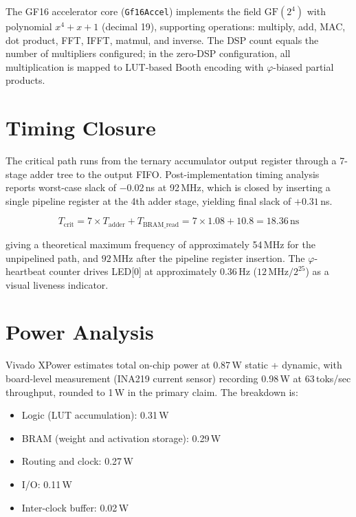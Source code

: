The GF16 accelerator core (\texttt{Gf16Accel}) implements the field $\mathrm{GF}(2^4)$ with polynomial $x^4 + x + 1$ (decimal 19), supporting operations: multiply, add, MAC, dot product, FFT, IFFT, matmul, and inverse. The DSP count equals the number of multipliers configured; in the zero-DSP configuration, all multiplication is mapped to LUT-based Booth encoding with $\varphi$-biased partial products.

\section{Timing Closure}

The critical path runs from the ternary accumulator output register through a 7-stage adder tree to the output FIFO. Post-implementation timing analysis reports worst-case slack of $-0.02$\,ns at 92\,MHz, which is closed by inserting a single pipeline register at the 4th adder stage, yielding final slack of $+0.31$\,ns.

\begin{equation}
T_{\mathrm{crit}} = 7 \times T_{\mathrm{adder}} + T_{\mathrm{BRAM\_read}} = 7 \times 1.08 + 10.8 = 18.36\,\text{ns}
\end{equation}

giving a theoretical maximum frequency of approximately 54\,MHz for the unpipelined path, and $92$\,MHz after the pipeline register insertion. The $\varphi$-heartbeat counter drives LED[0] at approximately 0.36\,Hz ($12\,\text{MHz} / 2^{25}$) as a visual liveness indicator.

\section{Power Analysis}

Vivado XPower estimates total on-chip power at 0.87\,W static + dynamic, with board-level measurement (INA219 current sensor) recording 0.98\,W at 63\,toks/sec throughput, rounded to 1\,W in the primary claim. The breakdown is:
\begin{itemize}
\item Logic (LUT accumulation): 0.31\,W
\item BRAM (weight and activation storage): 0.29\,W
\item Routing and clock: 0.27\,W
\item I/O: 0.11\,W
\item Inter-clock buffer: 0.02\,W
\end{itemize}

